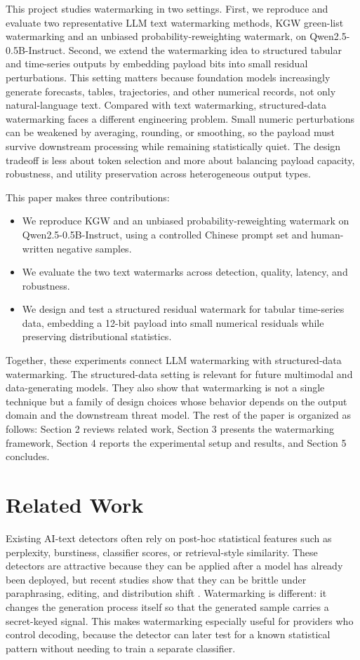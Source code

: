 \documentclass[11pt]{article}
\begin{document}
This project studies watermarking in two settings.
First, we reproduce and evaluate two representative LLM text watermarking methods, KGW green-list watermarking and an unbiased probability-reweighting watermark, on Qwen2.5-0.5B-Instruct.
Second, we extend the watermarking idea to structured tabular and time-series outputs by embedding payload bits into small residual perturbations.
This setting matters because foundation models increasingly generate forecasts, tables, trajectories, and other numerical records, not only natural-language text.
Compared with text watermarking, structured-data watermarking faces a different engineering problem.
Small numeric perturbations can be weakened by averaging, rounding, or smoothing, so the payload must survive downstream processing while remaining statistically quiet.
The design tradeoff is less about token selection and more about balancing payload capacity, robustness, and utility preservation across heterogeneous output types.

This paper makes three contributions:
\begin{itemize}[label=\textbf{\textbullet}]
  \item We reproduce KGW and an unbiased probability-reweighting watermark on Qwen2.5-0.5B-Instruct, using a controlled Chinese prompt set and human-written negative samples.
  \item We evaluate the two text watermarks across detection, quality, latency, and robustness.
  \item We design and test a structured residual watermark for tabular time-series data, embedding a 12-bit payload into small numerical residuals while preserving distributional statistics.
\end{itemize}
Together, these experiments connect LLM watermarking with structured-data watermarking.
The structured-data setting is relevant for future multimodal and data-generating models.
They also show that watermarking is not a single technique but a family of design choices whose behavior depends on the output domain and the downstream threat model.
The rest of the paper is organized as follows: Section 2 reviews related work, Section 3 presents the watermarking framework, Section 4 reports the experimental setup and results, and Section 5 concludes.

\section{Related Work}

Existing AI-text detectors often rely on post-hoc statistical features such as perplexity, burstiness, classifier scores, or retrieval-style similarity.
These detectors are attractive because they can be applied after a model has already been deployed, but recent studies show that they can be brittle under paraphrasing, editing, and distribution shift \cite{sadasivan2023}.
Watermarking is different: it changes the generation process itself so that the generated sample carries a secret-keyed signal.
This makes watermarking especially useful for providers who control decoding, because the detector can later test for a known statistical pattern without needing to train a separate classifier.
\end{document}
